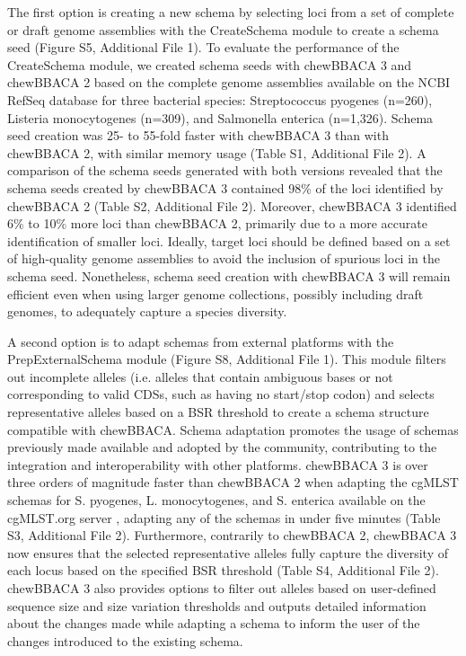 The first option is creating a new schema by selecting loci from a set of complete or draft genome assemblies with the CreateSchema module to create a schema seed (Figure S5, Additional File 1). To evaluate the performance of the CreateSchema module, we created schema seeds with chewBBACA 3 and chewBBACA 2 based on the complete genome assemblies available on the NCBI RefSeq database \citep{sayers_database_2022} for three bacterial species: Streptococcus pyogenes (n=260), Listeria monocytogenes (n=309), and Salmonella enterica (n=1,326). Schema seed creation was 25- to 55-fold faster with chewBBACA 3 than with chewBBACA 2, with similar memory usage (Table S1, Additional File 2). A comparison of the schema seeds generated with both versions revealed that the schema seeds created by chewBBACA 3 contained 98\% of the loci identified by chewBBACA 2 (Table S2, Additional File 2). Moreover, chewBBACA 3 identified 6\% to 10\% more loci than chewBBACA 2, primarily due to a more accurate identification of smaller loci. Ideally, target loci should be defined based on a set of high-quality genome assemblies to avoid the inclusion of spurious loci in the schema seed. Nonetheless, schema seed creation with chewBBACA 3 will remain efficient even when using larger genome collections, possibly including draft genomes, to adequately capture a species diversity.

A second option is to adapt schemas from external platforms with the PrepExternalSchema module (Figure S8, Additional File 1). This module filters out incomplete alleles (i.e. alleles that contain ambiguous bases or not corresponding to valid CDSs, such as having no start/stop codon) and selects representative alleles based on a BSR threshold to create a schema structure compatible with chewBBACA. Schema adaptation promotes the usage of schemas previously made available and adopted by the community, contributing to the integration and interoperability with other platforms. chewBBACA 3 is over three orders of magnitude faster than chewBBACA 2 when adapting the cgMLST schemas for S. pyogenes, L. monocytogenes, and S. enterica available on the cgMLST.org server \citep{noauthor_cgmlstorg_nodate}, adapting any of the schemas in under five minutes (Table S3, Additional File 2). Furthermore, contrarily to chewBBACA 2, chewBBACA 3 now ensures that the selected representative alleles fully capture the diversity of each locus based on the specified BSR threshold (Table S4, Additional File 2). chewBBACA 3 also provides options to filter out alleles based on user-defined sequence size and size variation thresholds and outputs detailed information about the changes made while adapting a schema to inform the user of the changes introduced to the existing schema.

